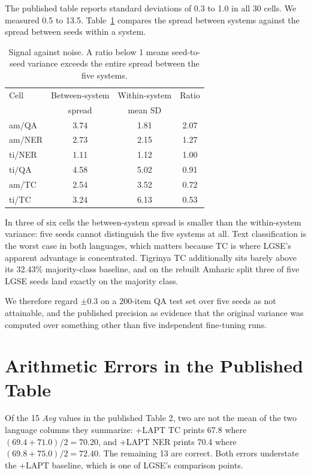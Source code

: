 \documentclass[11pt]{article}
\begin{document}
The published table reports standard deviations of 0.3 to 1.0 in all 30
cells. We measured 0.5 to 13.5. Table~\ref{tab:snr} compares the spread
between systems against the spread between seeds within a system.

\begin{table}[t]
\centering
\small
\begin{tabular}{lccc}
\toprule
Cell & Between-system & Within-system & Ratio \\
     & spread & mean SD & \\
\midrule
am/QA  & 3.74 & 1.81 & 2.07 \\
am/NER & 2.73 & 2.15 & 1.27 \\
ti/NER & 1.11 & 1.12 & 1.00 \\
ti/QA  & 4.58 & 5.02 & 0.91 \\
am/TC  & 2.54 & 3.52 & 0.72 \\
ti/TC  & 3.24 & 6.13 & 0.53 \\
\bottomrule
\end{tabular}
\caption{Signal against noise. A ratio below 1 means seed-to-seed variance
exceeds the entire spread between the five systems.}
\label{tab:snr}
\end{table}

In three of six cells the between-system spread is smaller than the
within-system variance: five seeds cannot distinguish the five systems at
all. Text classification is the worst case in both languages, which matters
because TC is where LGSE's apparent advantage is concentrated. Tigrinya TC
additionally sits barely above its 32.43\% majority-class baseline, and on
the rebuilt Amharic split three of five LGSE seeds land exactly on the
majority class.

We therefore regard $\pm 0.3$ on a 200-item QA test set over five seeds as
not attainable, and the published precision as evidence that the original
variance was computed over something other than five independent
fine-tuning runs.

\section{Arithmetic Errors in the Published Table}

Of the 15 \textit{Avg} values in the published Table 2, two are not the mean
of the two language columns they summarize: \textsc{+LAPT} TC prints 67.8
where $(69.4+71.0)/2 = 70.20$, and \textsc{+LAPT} NER prints 70.4 where
$(69.8+75.0)/2 = 72.40$. The remaining 13 are correct. Both errors
understate the \textsc{+LAPT} baseline, which is one of LGSE's comparison
points.
\end{document}
